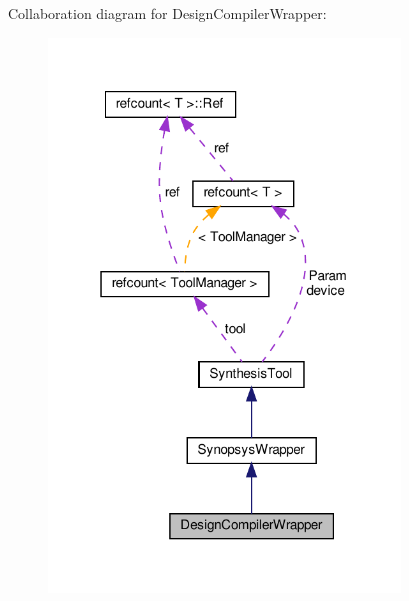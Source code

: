 Collaboration diagram for Design\+Compiler\+Wrapper\+:
\nopagebreak
\begin{figure}[H]
\begin{center}
\leavevmode
\includegraphics[width=265pt]{df/dd5/classDesignCompilerWrapper__coll__graph}
\end{center}
\end{figure}
